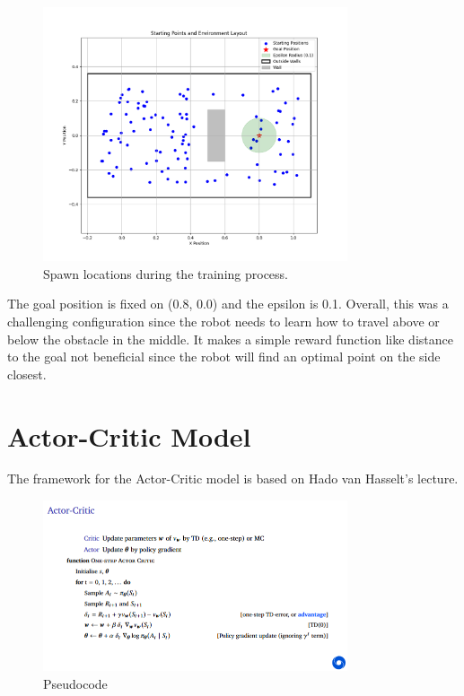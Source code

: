 \documentclass[12pt]{article}
\begin{document}
\begin{figure}[H]
    \centering
    \includegraphics[width=0.8\textwidth]{report/images/environment.png}
    \caption{Spawn locations during the training process.}
    \label{fig:trajectory}
\end{figure}

The goal position is fixed on (0.8, 0.0) and the epsilon is 0.1. Overall, this was a challenging configuration since the robot needs to learn how to travel above or below the obstacle in the middle. It makes a simple reward function like distance to the goal not beneficial since the robot will find an optimal point on the side closest. 

\section{Actor-Critic Model}

The framework for the Actor-Critic model is based on Hado van Hasselt's lecture. 

\begin{figure}[H]
    \centering
    \includegraphics[width=0.8\textwidth]{report/images/slide40.PNG}
    \caption{Pseudocode}
    \label{fig:slide40}
\end{figure}
\end{document}
